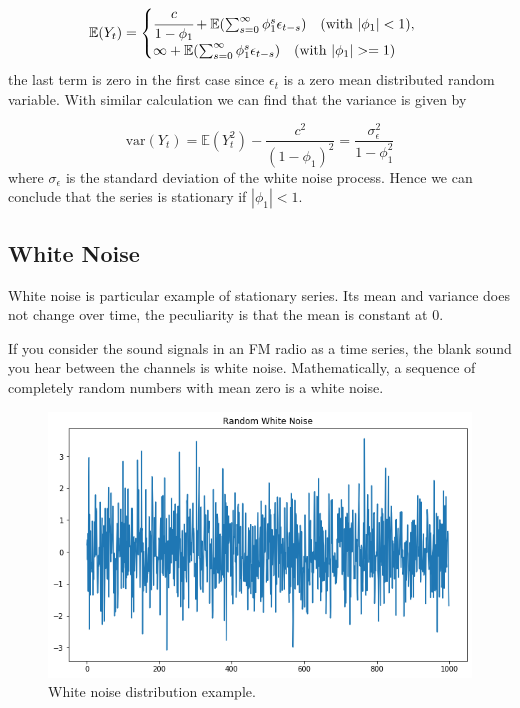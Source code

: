 \begin{equation}
\mathbb{E}(Y_t) =
\begin{cases}
\cfrac{c}{1-\phi_1} + \mathbb{E}(\sum_{s=0}^{\infty} \phi_1^s \epsilon_{t-s})\quad (\textrm{with } |\phi_1| < 1), \\
\infty + \mathbb{E}(\sum_{s=0}^{\infty} \phi_1^s \epsilon_{t-s})\quad (\textrm{with } |\phi_1| >= 1)
\end{cases}
\end{equation}
the last term is zero in the first case since \(\epsilon_t\) is a
zero mean distributed random variable. With similar calculation we can
find that the variance is given by

\begin{equation}
\textrm{var}(Y_t) = \mathbb{E}(Y_t^2) − \frac{c^2}{(1-\phi_1)^2} = \frac{\sigma_{\epsilon}^2}{1-\phi_1^2}
\end{equation}
where \(\sigma_{\epsilon}\) is the standard deviation of the white noise
process. Hence we can conclude that the series is stationary if
\(|\phi_1| < 1\).

\subsection{White Noise}\label{white-noise}

White noise is particular example of stationary series. Its mean and
variance does not change over time, the peculiarity is that the mean is
constant at 0.

If you consider the sound signals in an FM radio as a time series, the
blank sound you hear between the channels is white noise.
Mathematically, a sequence of completely random numbers with mean zero
is a white noise.

\begin{figure}[htb]
	\centering
	\includegraphics[width=0.7\linewidth]{figures/white_noise.png}
	\caption{White noise distribution example.}
	\label{fig:white_noise}
\end{figure}

